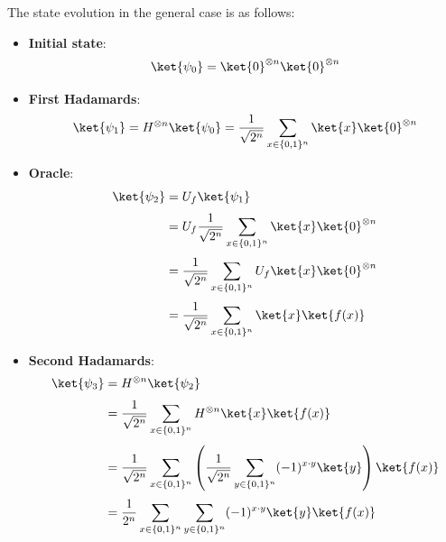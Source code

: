 \noindent
The state evolution in the general case is as follows:
\begin{itemize}
    \item \textbf{Initial state}:
        \begin{equation*}
            \ket{\psi_{0}} = \ket{0}^{\otimes n} \ket{0}^{\otimes n}
        \end{equation*}

    \item \textbf{First Hadamards}:
        \begin{equation*}
            \ket{\psi_{1}} = H^{\otimes n} \ket{\psi_{0}} = \frac{1}{\sqrt{2^{n}}} \sum_{x \in \{0,1\}^n} \ket{x} \ket{0}^{\otimes n}
        \end{equation*}

    \item \textbf{Oracle}:
        \begin{align*}
            \ket{\psi_{2}} &= U_f \ket{\psi_{1}} \\[.3em]
            &= U_f \frac{1}{\sqrt{2^{n}}} \sum_{x \in \{0,1\}^n} \ket{x} \ket{0}^{\otimes n} \\[.3em]
            &= \frac{1}{\sqrt{2^{n}}} \sum_{x \in \{0,1\}^n} U_f \ket{x} \ket{0}^{\otimes n} \\[.3em]
            &= \frac{1}{\sqrt{2^{n}}} \sum_{x \in \{0,1\}^n} \ket{x} \ket{f(x)}
        \end{align*}

    \item \textbf{Second Hadamards}:
        \begin{align*}
            \ket{\psi_{3}} &= H^{\otimes n} \ket{\psi_{2}} \\[.3em]
            &= \frac{1}{\sqrt{2^{n}}} \sum_{x \in \{0,1\}^n} H^{\otimes n} \ket{x} \ket{f(x)} \\[.3em]
            &= \frac{1}{\sqrt{2^{n}}} \sum_{x \in \{0,1\}^n} \left(
                \frac{1}{\sqrt{2^{n}}} \sum_{y \in \{0,1\}^n} (-1)^{x \cdot y} \ket{y}
            \right) \ket{f(x)} \\[.3em]
            &= \frac{1}{2^{n}} \sum_{x \in \{0,1\}^n} \sum_{y \in \{0,1\}^n} (-1)^{x \cdot y} \ket{y} \ket{f(x)}
        \end{align*}


\end{itemize}
